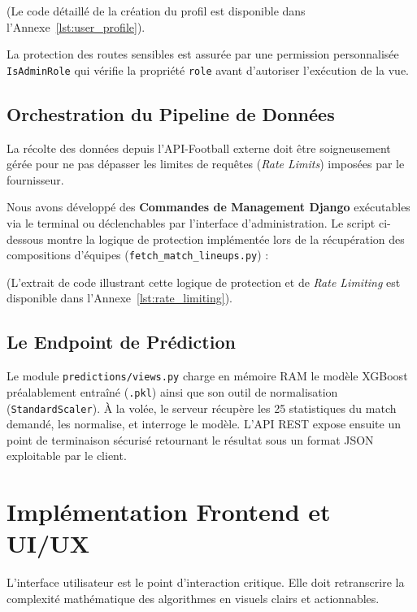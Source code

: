 (Le code détaillé de la création du profil est disponible dans l'Annexe~\ref{lst:user_profile}).

La protection des routes sensibles est assurée par une permission personnalisée \texttt{IsAdminRole} qui vérifie la propriété \texttt{role} avant d'autoriser l'exécution de la vue.

\subsection{Orchestration du Pipeline de Données}
La récolte des données depuis l'API-Football externe doit être soigneusement gérée pour ne pas dépasser les limites de requêtes (\textit{Rate Limits}) imposées par le fournisseur.

Nous avons développé des \textbf{Commandes de Management Django} exécutables via le terminal ou déclenchables par l'interface d'administration.
Le script ci-dessous montre la logique de protection implémentée lors de la récupération des compositions d'équipes (\texttt{fetch\_match\_lineups.py}) :

(L'extrait de code illustrant cette logique de protection et de \textit{Rate Limiting} est disponible dans l'Annexe~\ref{lst:rate_limiting}).

\subsection{Le Endpoint de Prédiction}
Le module \texttt{predictions/views.py} charge en mémoire RAM le modèle XGBoost préalablement entraîné (\texttt{.pkl}) ainsi que son outil de normalisation (\texttt{StandardScaler}). À la volée, le serveur récupère les 25 statistiques du match demandé, les normalise, et interroge le modèle. L'API REST expose ensuite un point de terminaison sécurisé retournant le résultat sous un format JSON exploitable par le client.

\section{Implémentation Frontend et UI/UX}

L'interface utilisateur est le point d'interaction critique. Elle doit retranscrire la complexité mathématique des algorithmes en visuels clairs et actionnables.

